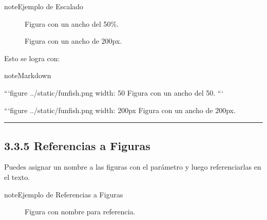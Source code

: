 \documentclass[a4paper,10pt,spanish]{sphinxmanual}
\let\sphinxpxdimen\pdfpxdimen\else\newdimen\sphinxpxdimen
\begin{document}
\begin{sphinxadmonition}{note}{Ejemplo de Escalado}

\begin{figure}[H]
\centering
\capstart

\noindent{}
\caption{Figura con un ancho del 50\%.}\label{\detokenize{3_guia_myst/imagenes_figuras:id4}}\end{figure}

\begin{figure}[H]
\centering
\capstart

\noindent\sphinxincludegraphics[width=200\sphinxpxdimen]{{fun-fish}.png}
\caption{Figura con un ancho de 200px.}\label{\detokenize{3_guia_myst/imagenes_figuras:id5}}\end{figure}
\end{sphinxadmonition}

\sphinxAtStartPar
Esto se logra con:

\begin{sphinxadmonition}{note}{Markdown}

\begin{sphinxVerbatim}[commandchars=\\\{\}]
```\PYGZob{}figure\PYGZcb{} ../\PYGZus{}static/fun\PYGZhy{}fish.png
\PYGZhy{}\PYGZhy{}\PYGZhy{}
width: 50\PYGZpc{}
\PYGZhy{}\PYGZhy{}\PYGZhy{}
Figura con un ancho del 50\PYGZpc{}.
```

```\PYGZob{}figure\PYGZcb{} ../\PYGZus{}static/fun\PYGZhy{}fish.png
\PYGZhy{}\PYGZhy{}\PYGZhy{}
width: 200px
\PYGZhy{}\PYGZhy{}\PYGZhy{}
Figura con un ancho de 200px.
\end{sphinxVerbatim}
\end{sphinxadmonition}


\bigskip\hrule\bigskip



\subsection{3.3.5 Referencias a Figuras}
\label{\detokenize{3_guia_myst/imagenes_figuras:referencias-a-figuras}}
\sphinxAtStartPar
Puedes asignar un nombre a las figuras con el parámetro  y luego referenciarlas en el texto.

\begin{sphinxadmonition}{note}{Ejemplo de Referencias a Figuras}

\begin{figure}[H]
\centering
\capstart

\noindent{}
\caption{Figura con nombre para referencia.}\label{\detokenize{3_guia_myst/imagenes_figuras:fun-fish}}\end{figure}
\end{sphinxadmonition}
\end{document}

